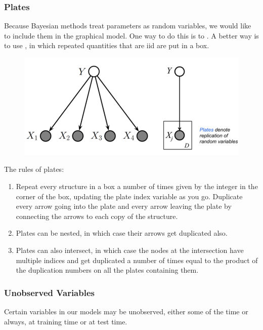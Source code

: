 \documentclass[11pt]{article}
\begin{document}
\subsubsection{Plates}
Because Bayesian methods treat parameters as random variables, we would like to include them in the graphical model. One way to do this is to . A better way is to use , in which repeated quantities that are iid are put in a box.

\begin{figure}[H]
	\centering
	\includegraphics[scale=0.3]{p8.png}
\end{figure}
The rules of plates:
\begin{enumerate}
	\item Repeat every structure in a box a number of times given by the integer in the corner of the box, updating the plate index variable as you go. Duplicate every arrow going into the plate and every arrow leaving the plate by connecting the arrows to each copy of the structure.
	\item Plates can be nested, in which case their arrows get duplicated also.
	\item Plates can also intersect, in which case the nodes at the intersection have multiple indices and get duplicated a number of times equal to the product of the duplication numbers on all the plates containing them.
\end{enumerate}


\subsubsection{Unobserved Variables}
Certain variables in our models may be unobserved, either some of the time or always, at training time or at test time.
\end{document}
